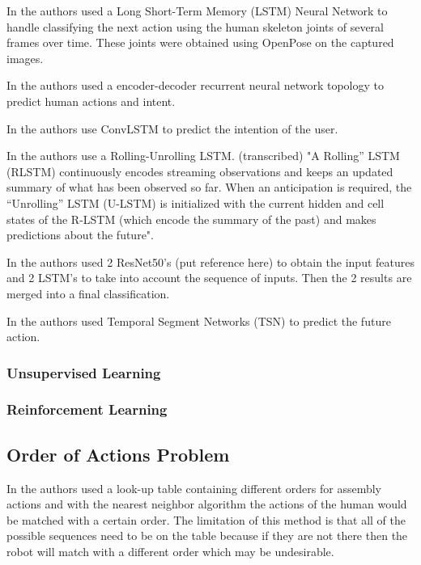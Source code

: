 In \cite{Canuto2021} the authors used a Long Short-Term Memory (LSTM) Neural Network to handle classifying the next action using the human skeleton joints of several frames over time. These joints were obtained using OpenPose on the captured images.

In \cite{Schydlo2018} the authors used a encoder-decoder recurrent neural network topology to predict human actions and intent.

In \cite{Zhang2022} the authors use ConvLSTM to predict the intention of the user.

In \cite{Furnari2021} the authors use a Rolling-Unrolling LSTM. {\color{red} (transcribed) "A Rolling” LSTM (RLSTM) continuously encodes streaming observations and keeps an updated summary of what has been observed so far. When an anticipation is required, the “Unrolling” LSTM (U-LSTM) is initialized with the current hidden and cell states of the R-LSTM (which encode the summary of the past) and makes predictions about the future".}

In \cite{Gammulle2019} the authors used 2 ResNet50's {\color{red} (put reference here)} to obtain the input features and 2 LSTM's to take into account the sequence of inputs. Then the 2 results are merged into a final classification.

In \cite{Wu2021} the authors used Temporal Segment Networks (TSN) to predict the future action.

\subsubsection{Unsupervised Learning}

\subsubsection{Reinforcement Learning}

\subsection{Order of Actions Problem}

In \cite{Maeda2016} the authors used a look-up table containing different orders for assembly actions and with the nearest neighbor algorithm the actions of the human would be matched with a certain order. The limitation of this method is that all of the possible sequences need to be on the table because if they are not there then the robot will match with a different order which may be undesirable.

